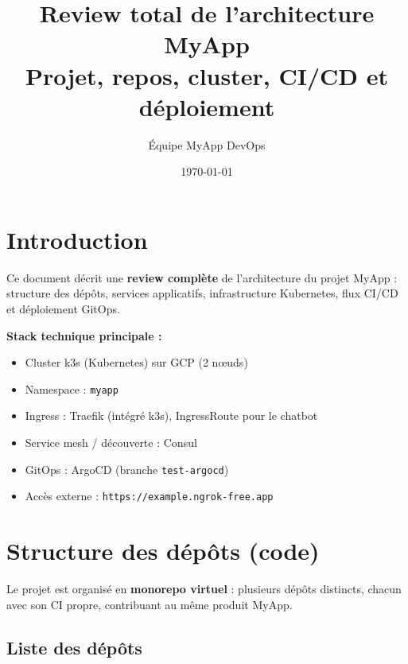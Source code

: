 \documentclass[11pt,a4paper]{article}
\title{\textbf{Review total de l'architecture MyApp} \\ \large Projet, repos, cluster, CI/CD et déploiement}
\author{Équipe MyApp DevOps}
\date{\today}
\begin{document}
\maketitle
\tableofcontents
\newpage

\section{Introduction}

Ce document décrit une \textbf{review complète} de l'architecture du projet MyApp : structure des dépôts, services applicatifs, infrastructure Kubernetes, flux CI/CD et déploiement GitOps.

\textbf{Stack technique principale :}
\begin{itemize}[noitemsep]
  \item Cluster k3s (Kubernetes) sur GCP (2 nœuds)
  \item Namespace : \texttt{myapp}
  \item Ingress : Traefik (intégré k3s), IngressRoute pour le chatbot
  \item Service mesh / découverte : Consul
  \item GitOps : ArgoCD (branche \texttt{test-argocd})
  \item Accès externe : \texttt{https://example.ngrok-free.app}
\end{itemize}

\section{Structure des dépôts (code)}

Le projet est organisé en \textbf{monorepo virtuel} : plusieurs dépôts distincts, chacun avec son CI propre, contribuant au même produit MyApp.

\subsection{Liste des dépôts}
\end{document}
